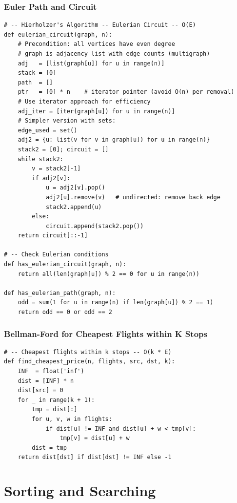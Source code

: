 \documentclass[11pt,a4paper]{report}
\begin{document}
\section{Euler Path and Circuit}

\begin{lstlisting}
# -- Hierholzer's Algorithm -- Eulerian Circuit -- O(E)
def eulerian_circuit(graph, n):
    # Precondition: all vertices have even degree
    # graph is adjacency list with edge counts (multigraph)
    adj   = [list(graph[u]) for u in range(n)]
    stack = [0]
    path  = []
    ptr   = [0] * n    # iterator pointer (avoid O(n) per removal)
    # Use iterator approach for efficiency
    adj_iter = [iter(graph[u]) for u in range(n)]
    # Simpler version with sets:
    edge_used = set()
    adj2 = {u: list(v for v in graph[u]) for u in range(n)}
    stack2 = [0]; circuit = []
    while stack2:
        v = stack2[-1]
        if adj2[v]:
            u = adj2[v].pop()
            adj2[u].remove(v)   # undirected: remove back edge
            stack2.append(u)
        else:
            circuit.append(stack2.pop())
    return circuit[::-1]

# -- Check Eulerian conditions
def has_eulerian_circuit(graph, n):
    return all(len(graph[u]) % 2 == 0 for u in range(n))

def has_eulerian_path(graph, n):
    odd = sum(1 for u in range(n) if len(graph[u]) % 2 == 1)
    return odd == 0 or odd == 2
\end{lstlisting}

\section{Bellman-Ford for Cheapest Flights within K Stops}

\begin{lstlisting}
# -- Cheapest flights within k stops -- O(k * E)
def find_cheapest_price(n, flights, src, dst, k):
    INF  = float('inf')
    dist = [INF] * n
    dist[src] = 0
    for _ in range(k + 1):
        tmp = dist[:]
        for u, v, w in flights:
            if dist[u] != INF and dist[u] + w < tmp[v]:
                tmp[v] = dist[u] + w
        dist = tmp
    return dist[dst] if dist[dst] != INF else -1
\end{lstlisting}


\part{Sorting and Searching}
\end{document}
